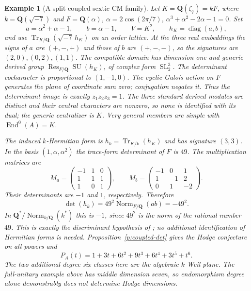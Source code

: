 \documentclass[10pt,reqno]{article}
\theoremstyle{emphasizedplain}
\theoremstyle{emphasizeddefinition}
\newtheorem{example}[theorem]{Example}
\theoremstyle{emphasizeddefinition}
\DeclareMathOperator{\End}{End}
\DeclareMathOperator{\SL}{SL}
\DeclareMathOperator{\SU}{SU}
\DeclareMathOperator{\Res}{Res}
\DeclareMathOperator{\Tr}{Tr}
\newcommand{\Q}{\mathbf Q}
\begin{document}
\begin{example}[A split coupled sextic-CM family]
Let $K=\Q(\zeta_7)=kF$, where $k=\Q(\sqrt{-7})$ and
$F=\Q(\alpha)$, $\alpha=2\cos(2\pi/7)$,
$\alpha^3+\alpha^2-2\alpha-1=0$. Set
\[
 a=\alpha^2+\alpha-1,\qquad b=\alpha-1,\qquad
 V=K^2,\qquad h_K=\operatorname{diag}(a,b),
\]
and use $\Tr_{K/\Q}(\sqrt{-7}\,h_K)$ on an order lattice.
At the three real embeddings the signs of $a$ are $(+,-,+)$ and those
of $b$ are $(+,-,-)$, so the signatures are $(2,0),(0,2),(1,1)$.
The compatible domain has dimension one and generic derived group
$\Res_{F/\Q}\SU(h_K)$, of complex form $\SL_2^3$.
The determinant cocharacter is proportional to $(1,-1,0)$.
The cyclic Galois action on $F$ generates the plane of coordinate sum
zero; conjugation negates it. Thus the determinant image is exactly
$z_1z_2z_3=1$. The three standard derived modules are distinct and their
central characters are nonzero, so none is identified with its dual;
the generic centralizer is $K$. Very general members are simple with
$\End^0(A)=K$.

The induced $k$-Hermitian form is $h_k=\Tr_{K/k}(h_K)$ and has signature
$(3,3)$. In the basis $(1,\alpha,\alpha^2)$ the trace-form determinant
of $F$ is $49$. The multiplication matrices are
\[ M_a=\begin{pmatrix}-1&1&0\\1&1&1\\1&0&1\end{pmatrix},\qquad
M_b=\begin{pmatrix}-1&0&1\\1&-1&2\\0&1&-2\end{pmatrix}. \]
Their determinants are $-1$ and $1$, respectively. Therefore
\[
 \det(h_k)=49^2\operatorname{Norm}_{F/\Q}(ab)=-49^2.
\]
In $\Q^*/\operatorname{Norm}_{k/\Q}(k^*)$ this is $-1$, since
$49^2$ is the norm of the rational number $49$.
This is exactly the discriminant hypothesis of
\cite[Theorem 1.5.1]{Markman}; no additional identification of Hermitian
forms is needed. Proposition~\ref{p:coupled-det} gives the Hodge
conjecture on all powers and
\[ P_A(t)=1+3t+6t^2+9t^3+6t^4+3t^5+t^6. \]
The two additional degree-six classes here are the algebraic $k$-Weil
plane. The full-unitary example above has middle dimension seven, so
endomorphism degree alone demonstrably does not determine Hodge dimensions.
\end{example}
\end{document}
